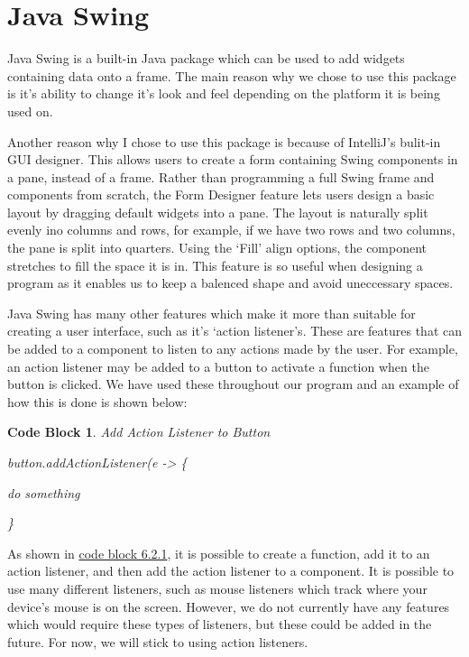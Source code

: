 \documentclass[12pt, a4paper, oneside]{book}
\newtheorem{codeblock}[theorem]{Code Block}
\numberwithin{equation}{section}
\begin{document}
\section{Java Swing}\label{sec:6.2}

Java Swing is a built-in Java package which can be used to add widgets containing data onto a frame. The main reason why we chose to use this package is it's ability to change it's look and feel depending on the platform it is being used on.

Another reason why I chose to use this package is because of IntelliJ's bulit-in GUI designer. This allows users to create a form containing Swing components in a pane, instead of a frame. Rather than programming a full Swing frame and components from scratch, the Form Designer feature lets users design a basic layout by dragging default widgets into a pane. The layout is naturally split evenly ino columns and rows, for example, if we have two rows and two columns, the pane is split into quarters. Using the `Fill' align options, the component stretches to fill the space it is in. This feature is so useful when designing a program as it enables us to keep a balenced shape and avoid uneccessary spaces.

Java Swing has many other features which make it more than suitable for creating a user interface, such as it's `action listener's. These are features that can be added to a component to listen to any actions made by the user. For example, an action listener may be added to a button to activate a function when the button is clicked. We have used these throughout our program and an example of how this is done is shown below:

\begin{codeblock} \label{Add Action Listener to Button}
  Add Action Listener to Button

  button.addActionListener(e -> \{

  \hspace{\parindent}do something

  \}
\end{codeblock}

As shown in \hyperref[Add Action Listener to Button]{code block 6.2.1}, it is possible to create a function, add it to an action listener, and then add the action listener to a component. It is possible to use many different listeners, such as mouse listeners which track where your device's mouse is on the screen. However, we do not currently have any features which would require these types of listeners, but these could be added in the future. For now, we will stick to using action listeners.
\end{document}
